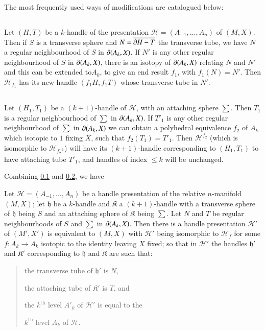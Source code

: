 The most frequently used ways of modifications are catalogued below:

\subsection{}\label{chap8-sec8.4.1}
Let $(H,T)$ be a $k$-handle of the presentation $\mathscr{H}=(A_{-1},\ldots,A_{n})$ of $(M,X)$. Then if $S$ is a transverse sphere and $N=\overline{\partial H-T}$ the transverse tube, we have $N$ a regular neighbourhood of $S$ in $\partial (A_{k},X)$. If $N'$ is any other regular neighbourhood of $S$ in $\partial (A_{k},X)$, there is an isotopy of $\partial (A_{k},X)$ relating $N$ and $N'$ and this can be extended to\pageoriginale $A_{k}$, to give an end result $f_{1}$, with $f_{1}(N)=N'$. Then $\mathscr{H}_{f_{1}}$ has its new handle $(f_{1}H,f_{1}T)$ whose transverse tube in $N'$.

\subsection{}\label{chap8-sec8.4.2}
Let $(H_{1},T_{1})$ be a $(k+1)$-handle of $\mathscr{H}$, with an attaching sphere $\sum$. Then $T_{1}$ is a regular neighbourhood of $\sum$ in $\partial(A_{k},X)$. If $T'_{1}$ is any other regular neighbourhood of $\sum$ in $\partial (A_{k},X)$ we can obtain a polyhedral equivalence $f_{2}$ of $A_{k}$ which isotopic to $1$ fixing $X$, such that $f_{2}(T_{1})=T'_{1}$. Then $\mathscr{H}^{f_{2}}$ (which is isomorphic to $\mathscr{H}_{f^{-1}_{2}}$) will have its $(k+1)$-handle corresponding to $(H_{1},T_{1})$ to have attaching tube $T'_{1}$, and handles of index $\leq k$ will be unchanged.

Combining \ref{chap8-sec8.4.1} and \ref{chap8-sec8.4.2}, we have

\setcounter{proposition}{2}
\begin{proposition}\label{chap8-prop8.4.3}
Let $\mathscr{H}=(A_{-1},\ldots,A_{n})$ be a handle presentation of the relative $n$-manifold $(M,X)$; let $\mathfrak{h}$ be a $k$-handle and $\mathfrak{K}$ a $(k+1)$-handle with a transverse sphere of $\mathfrak{h}$ being $S$ and an attaching sphere of $\mathfrak{K}$ being $\sum$. Let $N$ and $T$ be regular neighbourhoods of $S$ and $\sum$ in $\partial (A_{k},X)$. Then there is a handle presentation $\mathscr{H}'$ of $(M',X')$ is equivalent to $(M,X)$ with $\mathscr{H}'$ being isomorphic to $\mathscr{H}_{f}$ for some $f:A_{k}\to A_{k}$ isotopic to the identity
leaving $X$ fixed; so that in $\mathscr{H}'$ the handles $\mathfrak{h}'$ and $\mathfrak{K}'$ corresponding to $\mathfrak{h}$ and $\mathfrak{K}$ are such that:
\begin{quote}
the transverse tube of $\mathfrak{h}'$ is $N$,

the attaching tube of $\mathfrak{K}'$ is $T$, and

the $k^{\text{th}}$ level $A'_{k}$ of $\mathscr{H}'$ is equal to the

$k^{\text{th}}$ level $A_{k}$ of $\mathscr{H}$.
\end{quote}
\end{proposition}

